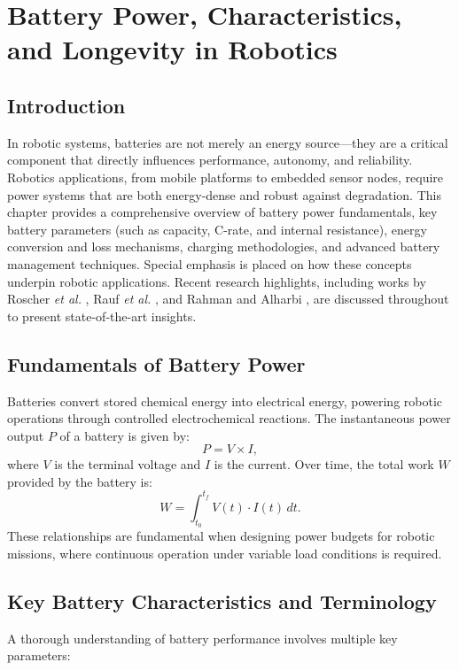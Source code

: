 \chapter{Battery Power, Characteristics, and Longevity in Robotics}
\label{chap:battery}

\section{Introduction}
In robotic systems, batteries are not merely an energy source—they are a critical component that directly influences performance, autonomy, and reliability. Robotics applications, from mobile platforms to embedded sensor nodes, require power systems that are both energy-dense and robust against degradation. This chapter provides a comprehensive overview of battery power fundamentals, key battery parameters (such as capacity, C-rate, and internal resistance), energy conversion and loss mechanisms, charging methodologies, and advanced battery management techniques. Special emphasis is placed on how these concepts underpin robotic applications. Recent research highlights, including works by Roscher \emph{et al.} \cite{Roscher2011}, Rauf \emph{et al.} \cite{Rauf2022}, and Rahman and Alharbi \cite{Rahman2024}, are discussed throughout to present state-of-the-art insights.

\section{Fundamentals of Battery Power}
Batteries convert stored chemical energy into electrical energy, powering robotic operations through controlled electrochemical reactions. The instantaneous power output \(P\) of a battery is given by:
\begin{equation}
P = V \times I,
\end{equation}
where \(V\) is the terminal voltage and \(I\) is the current. Over time, the total work \(W\) provided by the battery is:
\begin{equation}
W = \int_{t_0}^{t_f} V(t) \cdot I(t) \, dt.
\end{equation}
These relationships are fundamental when designing power budgets for robotic missions, where continuous operation under variable load conditions is required.

\section{Key Battery Characteristics and Terminology}
A thorough understanding of battery performance involves multiple key parameters:

